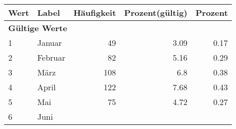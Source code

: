      \begin{longtable}{lXrrr}
     \toprule
     \textbf{Wert} & \textbf{Label} & \textbf{Häufigkeit} & \textbf{Prozent(gültig)} & \textbf{Prozent} \\
     \endhead
     \midrule
     \multicolumn{5}{l}{\textbf{Gültige Werte}}\\

     1 &
     \multicolumn{1}{X}{ Januar   } &


       \num{49} &
       \num[round-mode=places,round-precision=2]{3,09} &
         \num[round-mode=places,round-precision=2]{0,17} \\

     2 &
     \multicolumn{1}{X}{ Februar   } &


       \num{82} &
       \num[round-mode=places,round-precision=2]{5,16} &
         \num[round-mode=places,round-precision=2]{0,29} \\

     3 &
     \multicolumn{1}{X}{ März   } &


       \num{108} &
       \num[round-mode=places,round-precision=2]{6,8} &
         \num[round-mode=places,round-precision=2]{0,38} \\

     4 &
     \multicolumn{1}{X}{ April   } &


       \num{122} &
       \num[round-mode=places,round-precision=2]{7,68} &
         \num[round-mode=places,round-precision=2]{0,43} \\

     5 &
     \multicolumn{1}{X}{ Mai   } &


       \num{75} &
       \num[round-mode=places,round-precision=2]{4,72} &
         \num[round-mode=places,round-precision=2]{0,27} \\

     6 &
     \multicolumn{1}{X}{ Juni   } &



\end{longtable}
